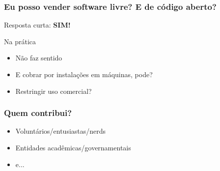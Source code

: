 \documentclass[xcolor=dvipsnames]{beamer}
\begin{document}
\begin{frame}
	\frametitle{Eu posso vender software livre? E de código aberto?}
Resposta curta: \textbf{SIM!}
\vspace{0.3cm}
\begin{block}{Na prática}
\begin{itemize}
\item Não faz sentido%
 
\item E cobrar por instalações em máquinas, pode?%
\item Restringir uso comercial?
\end{itemize}
\end{block}
\end{frame}

\begin{frame}
\frametitle{Quem contribui?}
\begin{itemize}
\item Voluntários/entusiastas/nerds
\item Entidades acadêmicas/governamentais
\item e...
\vspace{0.5cm}
\end{itemize}
\end{frame}
\end{document}
